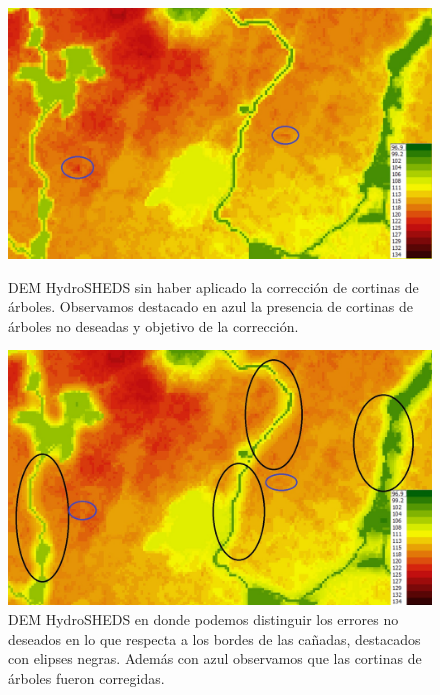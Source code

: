 \documentclass[10pt,a4paper, twoside]{report}
\begin{document}
\begin{figure}[!htb]
   \begin{minipage}{0.48\textwidth}
			\centering
			\includegraphics[width=1.0\linewidth]{imagenes/HydroSHEDSTreesZoom.jpg}
			\caption{DEM HydroSHEDS sin haber aplicado la corrección de cortinas de árboles. Observamos destacado en azul la presencia de cortinas de árboles no deseadas y objetivo de la corrección.}
			\label{HydroSHEDSTreesZoom}
   \end{minipage}\hfill
   \begin {minipage}{0.48\textwidth}
			\centering
			\includegraphics[width=1.0\linewidth]{imagenes/HydroSHEDSTreesZoomCorrected.jpg}
			\caption{DEM HydroSHEDS en donde podemos distinguir los errores no deseados en lo que respecta a los bordes de las cañadas, destacados con elipses negras. Además con azul observamos que las cortinas de árboles fueron corregidas.}
			\label{HydroSHEDSTreesZoomCorrected}
   \end{minipage}
\end{figure}
\end{document}
